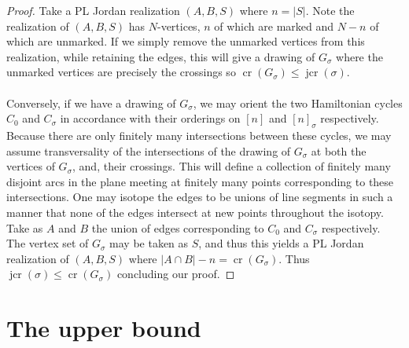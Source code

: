 \documentclass[11pt,a4paper]{amsart}
\theoremstyle{definition}
\theoremstyle{remark}
\DeclareMathOperator{\crn}{cr}
\DeclareMathOperator{\jcr}{jcr}
\begin{document}
\begin{proof}
Take a PL Jordan realization $(A,B,S)$ where $n = |S|$.  Note the realization of $(A,B,S)$ has $N$-vertices, $n$ of which are marked and $N-n$ of which are unmarked.  If we simply remove the unmarked vertices from this realization, while retaining the edges, this will give a drawing of $G_{\sigma}$ where the unmarked vertices are precisely the crossings so $\crn(G_{\sigma}) \leq \jcr(\sigma)$.  \\
\\
Conversely, if we have a drawing of $G_{\sigma}$, we may orient the two Hamiltonian cycles $C_{0}$ and $C_{\sigma}$ in accordance with their orderings on $[n]$ and $[n]_{\sigma}$ respectively.  Because there are only finitely many intersections between these cycles, we may assume transversality of the intersections of the drawing of $G_{\sigma}$ at both the vertices of $G_{\sigma}$, and, their crossings.  This will define a collection of finitely many disjoint arcs in the plane meeting at finitely many points corresponding to these intersections.  One may isotope the edges to be unions of line segments in such a manner that none of the edges intersect at new points throughout the isotopy.  Take as $A$ and $B$ the union of edges corresponding to $C_{0}$ and $C_{\sigma}$ respectively.  The vertex set of $G_{\sigma}$ may be taken as $S$, and thus this yields a PL Jordan realization of $(A,B,S)$ where $|A\cap B| - n = \crn(G_{\sigma})$.  Thus $\jcr(\sigma) \leq \crn(G_{\sigma})$ concluding our proof.  
\end{proof}


\section{The upper bound}
\label{sec:upper-bound}
\end{document}
